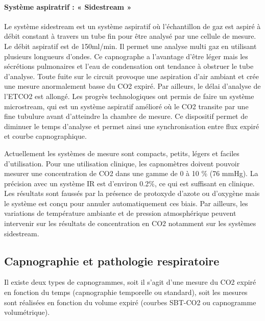 \documentclass[12pt,]{article}
\let\oldparagraph\paragraph
\renewcommand{\paragraph}[1]{\oldparagraph{#1}\mbox{}}
\begin{document}
\hypertarget{systeme-aspiratrif-sidestream}{%
\paragraph{Système aspiratrif : « Sidestream
»}\label{systeme-aspiratrif-sidestream}}

Le système sidestream est un système aspiratif où l'échantillon de gaz
est aspiré à débit constant à travers un tube fin pour être analysé par
une cellule de mesure. Le débit aspiratif est de 150ml/min. Il permet
une analyse multi gaz en utilisant plusieurs longueurs d'ondes. Ce
capnographe a l'avantage d'être léger mais les sécrétions pulmonaires et
l'eau de condensation ont tendance à obstruer le tube d'analyse. Toute
fuite sur le circuit provoque une aspiration d'air ambiant et crée une
mesure anormalement basse du CO2 expiré. Par ailleurs, le délai
d'analyse de l'ETCO2 est allongé. Les progrès technologiques ont permis
de faire un système microstream, qui est un système aspiratif amélioré
où le CO2 transite par une fine tubulure avant d'atteindre la chambre de
mesure. Ce dispositif permet de diminuer le temps d'analyse et permet
ainsi une synchronisation entre flux expiré et courbe capnographique.

Actuellement les systèmes de mesure sont compacts, petits, légers et
faciles d'utilisation. Pour une utilisation clinique, les capnomètres
doivent pouvoir mesurer une concentration de CO2 dans une gamme de 0 à
10 \% (76 mmHg). La précision avec un système IR est d'environ 0.2\%, ce
qui est suffisant en clinique. Les résultats sont faussés par la
présence de protoxyde d'azote ou d'oxygène mais le système est conçu
pour annuler automatiquement ces biais. Par ailleurs, les variations de
température ambiante et de pression atmosphérique peuvent intervenir sur
les résultats de concentration en CO2 notamment sur les systèmes
sidestream.

\hypertarget{capnographie-et-pathologie-respiratoire}{%
\subsection{Capnographie et pathologie
respiratoire}\label{capnographie-et-pathologie-respiratoire}}

Il existe deux types de capnogrammes, soit il s'agit d'une mesure du CO2
expiré en fonction du temps (capnographie temporelle ou standard), soit
les mesures sont réalisées en fonction du volume expiré (courbes SBT-CO2
ou capnogramme volumétrique).
\end{document}
